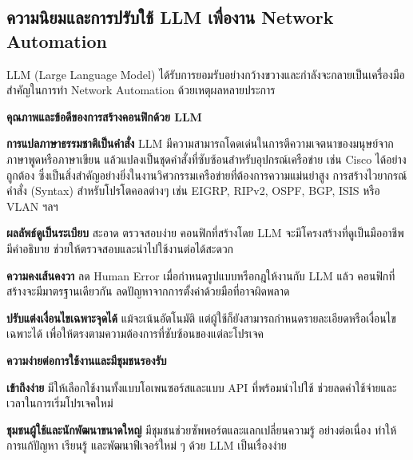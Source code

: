 \subsection{ความนิยมและการปรับใช้ LLM เพื่องาน Network Automation}
\hspace*{1.3em} %
LLM (Large Language Model) ได้รับการยอมรับอย่างกว้างขวางและกำลังจะกลายเป็นเครื่องมือสำคัญในการทำ Network Automation ด้วยเหตุผลหลายประการ

\textbf{คุณภาพและข้อดีของการสร้างคอนฟิกด้วย LLM}
    \begin{mycustomitem}
        \item \textbf{การแปลภาษาธรรมชาติเป็นคำสั่ง} LLM มีความสามารถโดดเด่นในการตีความเจตนาของมนุษย์จากภาษาพูดหรือภาษาเขียน แล้วแปลงเป็นชุดคำสั่งที่ซับซ้อนสำหรับอุปกรณ์เครือข่าย เช่น Cisco ได้อย่างถูกต้อง ซึ่งเป็นสิ่งสำคัญอย่างยิ่งในงานวิศวกรรมเครือข่ายที่ต้องการความแม่นยำสูง การสร้างไวยากรณ์คำสั่ง (Syntax) สำหรับโปรโตคอลต่างๆ เช่น EIGRP, RIPv2, OSPF, BGP, ISIS หรือ VLAN ฯลฯ
        \item \textbf{ผลลัพธ์ดูเป็นระเบียบ} สะอาด ตรวจสอบง่าย คอนฟิกที่สร้างโดย LLM จะมีโครงสร้างที่ดูเป็นมืออาชีพ มีคำอธิบาย ช่วยให้ตรวจสอบและนำไปใช้งานต่อได้สะดวก
        \item \textbf{ความคงเส้นคงวา} ลด Human Error เมื่อกำหนดรูปแบบหรือกฎให้งานกับ LLM แล้ว คอนฟิกที่สร้างจะมีมาตรฐานเดียวกัน ลดปัญหาจากการตั้งค่าด้วยมือที่อาจผิดพลาด
        \item \textbf{ปรับแต่งเงื่อนไขเฉพาะจุดได้} แม้จะเน้นอัตโนมัติ แต่ผู้ใช้ก็ยังสามารถกำหนดรายละเอียดหรือเงื่อนไขเฉพาะได้ เพื่อให้ตรงตามความต้องการที่ซับซ้อนของแต่ละโปรเจค
    \end{mycustomitem}

\textbf{ความง่ายต่อการใช้งานและมีชุมชนรองรับ}
    \begin{mycustomitem}
        \item \textbf{เข้าถึงง่าย} มีให้เลือกใช้งานทั้งแบบโอเพนซอร์สและแบบ API ที่พร้อมนำไปใช้ ช่วยลดค่าใช้จ่ายและเวลาในการเริ่มโปรเจคใหม่
        \item \textbf{ชุมชนผู้ใช้และนักพัฒนาขนาดใหญ่} มีชุมชนช่วยซัพพอร์ตและแลกเปลี่ยนความรู้ อย่างต่อเนื่อง ทำให้การแก้ปัญหา เรียนรู้ และพัฒนาฟีเจอร์ใหม่ ๆ ด้วย LLM เป็นเรื่องง่าย
    \end{mycustomitem}

\hspace*{1.3em} %

\hspace*{1.3em} %


